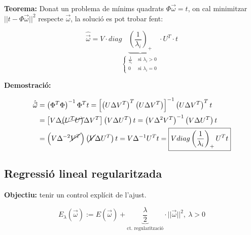 \documentclass[a4paper]{article}
\begin{document}
\textbf{Teorema:} Donat un problema de mínims quadrats $ \Phi \vec{\omega} = t $, on cal minimitzar $ ||t - \Phi \vec{\omega} ||^2 $ respecte $\vec{\omega}$, la solució es pot trobar fent:

$$
\hat{\vec{\omega}} = V · diag \underbrace{\left( \frac{1}{\lambda_i}\right)_+}_{\begin{cases}
	\frac{1}{\lambda_i} &\text{ si } \lambda_i > 0 \\
	0 & \text{ si } \lambda_i = 0
	\end{cases}}  · U^T · t
$$

\textbf{Demostració:}

\begin{align*}
\hat{\vec{\omega}} &= \left( \Phi^T \Phi \right)^{-1} \Phi^T t =
\left[ \left( U \Delta V^T \right)^T \left( U\Delta V^T \right) \right]^{-1}
\left(U\Delta V^T\right)^T t \\
& = \left[ V\Delta \cancel{\left( U^T U \right)} \Delta V^T \right] 
\left( V \Delta U^T \right) t = 
\left( V \Delta^2 V^T \right)^{-1} \left( V \Delta U^T \right) t \\ 
&=
\left( V \Delta^{-2} \cancel{V^T} \right) \left( \cancel{V} \Delta U^T \right) t = V \Delta^{-1} U^T t = 
\boxed{V diag\left(\frac{1}{\lambda_i}\right)_+ U^T t}
\end{align*}

\subsection{Regressió lineal regularitzada}

\textbf{Objectiu:} tenir un control explícit de l'ajust.

$$
E_{\lambda} (\vec{\omega}) := E(\vec{\omega}) + \underbrace{\frac{\lambda}{2}}_{\text{ct. regularització}}·||\vec{\omega}||^2, \ \lambda > 0
$$
\end{document}
